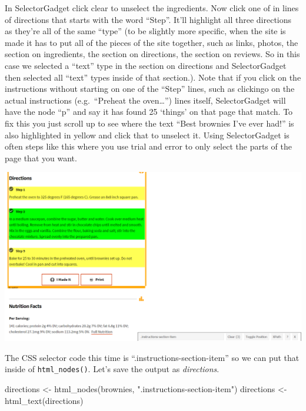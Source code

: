 \documentclass[
  12pt,
]{book}
\newenvironment{Shaded}{\begin{snugshade}}{\end{snugshade}}
\newcommand{\FunctionTok}[1]{\textcolor[rgb]{0,0,0}{#1}}
\newcommand{\NormalTok}[1]{#1}
\newcommand{\OtherTok}[1]{\textcolor[rgb]{0.37,0.37,0.37}{#1}}
\newcommand{\StringTok}[1]{\textcolor[rgb]{0.5,0.5,0.5}{#1}}
\begin{document}
In SelectorGadget click clear to unselect the ingredients. Now click one of in lines of directions that starts with the word ``Step''. It'll highlight all three directions as they're all of the same ``type'' (to be slightly more specific, when the site is made it has to put all of the pieces of the site together, such as links, photos, the section on ingredients, the section on directions, the section on reviews. So in this case we selected a ``text'' type in the section on directions and SelectorGadget then selected all ``text'' types inside of that section.). Note that if you click on the instructions without starting on one of the ``Step'' lines, such as clickingo on the actual instructions (e.g.~``Preheat the oven\ldots{}'') lines itself, SelectorGadget will have the node ``p'' and say it has found 25 `things' on that page that match. To fix this you just scroll up to see where the text ``Best brownies I've ever had!'' is also highlighted in yellow and click that to unselect it. Using SelectorGadget is often steps like this where you use trial and error to only select the parts of the page that you want.

\includegraphics{images/brownies_5.PNG}

The CSS selector code this time is ``.instructions-section-item'' so we can put that inside of \texttt{html\_nodes()}. Let's save the output as \emph{directions}.

\begin{Shaded}
\begin{Highlighting}[]
\NormalTok{directions }\OtherTok{\textless{}{-}} \FunctionTok{html\_nodes}\NormalTok{(brownies, }\StringTok{".instructions{-}section{-}item"}\NormalTok{)}
\NormalTok{directions }\OtherTok{\textless{}{-}} \FunctionTok{html\_text}\NormalTok{(directions)}
\end{Highlighting}
\end{Shaded}
\end{document}
